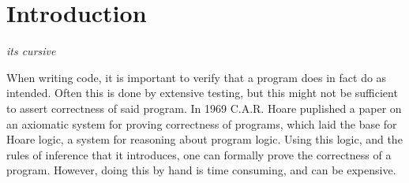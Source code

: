 \section{Introduction}












\textit{its cursive}

When writing code, it is important to verify that a program does in fact do as intended.
Often this is done by extensive testing, but this might not be sufficient to assert correctness of said program.
In 1969 C.A.R. Hoare puplished a paper on an axiomatic system for proving correctness of programs, which laid the base for Hoare logic, a system for reasoning about program logic\cite{Hoare}. Using this logic, and the rules of inference that it introduces, one can formally prove the correctness of a program.
However, doing this by hand is time consuming, and can be expensive. 


